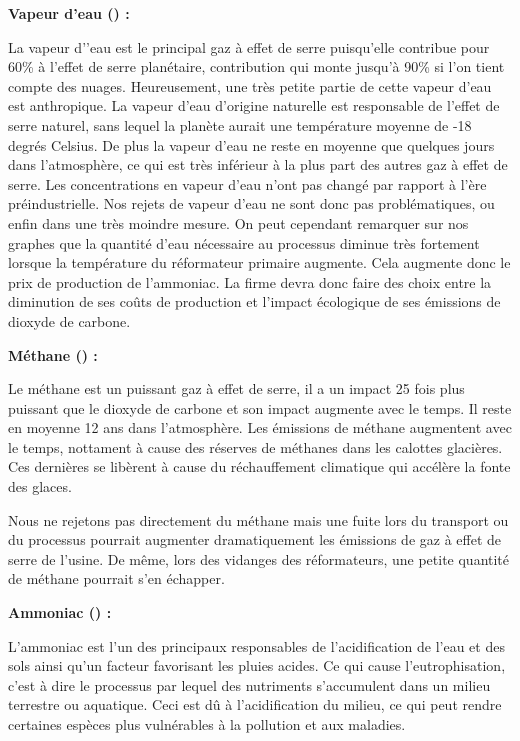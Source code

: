\documentclass[a4paper, oneside, 12pt]{article}
\begin{document}
\textbf{Vapeur d'eau () : }

La vapeur d’’eau est le principal gaz à effet de serre puisqu’elle contribue pour 60\% à l’effet de serre planétaire, contribution qui monte jusqu’à 90\% si l’on tient compte des nuages. Heureusement, une très petite partie de cette vapeur d’eau est anthropique. La vapeur d’eau d’origine naturelle est responsable de l’effet de serre naturel, sans lequel la planète aurait une température moyenne de -18 degrés Celsius. De plus la vapeur d’eau ne reste en moyenne que quelques jours dans l’atmosphère, ce qui est très inférieur à la plus part des autres gaz à effet de serre. Les concentrations en vapeur d’eau n’ont pas changé par rapport à l’ère préindustrielle. Nos rejets de vapeur d’eau ne sont donc pas problématiques, ou enfin dans une très moindre mesure. On peut cependant remarquer sur nos graphes que la quantité d’eau nécessaire au processus diminue très fortement lorsque la température du réformateur primaire augmente. Cela augmente donc le prix de production de l’ammoniac. La firme devra donc faire des choix entre la diminution de ses coûts de production et l’impact écologique de ses émissions de dioxyde de carbone.  \newline

\textbf{Méthane () :}

Le méthane est un puissant gaz à effet de serre, il a un impact 25 fois plus puissant que le dioxyde de carbone et son impact augmente avec le temps. Il reste en moyenne 12 ans dans l’atmosphère. Les émissions de méthane augmentent avec le temps, nottament à cause des réserves de méthanes dans les calottes glacières. Ces dernières se libèrent à cause du réchauffement climatique qui accélère la fonte des glaces. 

Nous ne rejetons pas directement du méthane mais une fuite lors du transport ou du processus pourrait augmenter dramatiquement les émissions de gaz à effet de serre de l’usine.  De même, lors des vidanges des réformateurs, une petite quantité de méthane pourrait s’en échapper.  \newline


\textbf{Ammoniac () : }

L’ammoniac est l’un des principaux responsables de l’acidification de l’eau et des sols ainsi qu’un facteur favorisant les pluies acides. Ce qui cause l’eutrophisation, c’est à dire le processus par lequel des nutriments s’accumulent dans un milieu terrestre ou aquatique. Ceci est dû à l’acidification du milieu, ce qui peut rendre certaines espèces plus vulnérables à la pollution et aux maladies. 
	
\end{document}
